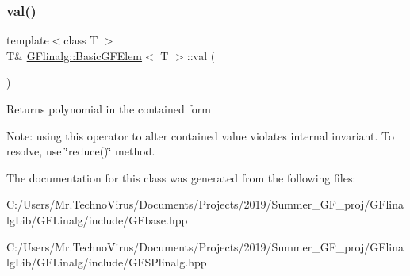 \subsubsection{\texorpdfstring{val()}{val()}}
{\footnotesize\ttfamily template$<$class T $>$ \\
T\& \mbox{\hyperlink{class_g_flinalg_1_1_basic_g_f_elem}{G\+Flinalg\+::\+Basic\+G\+F\+Elem}}$<$ T $>$\+::val (\begin{DoxyParamCaption}{ }\end{DoxyParamCaption})\hspace{0.3cm}{\ttfamily [inline]}}

Returns polynomial in the contained form

Note\+: using this operator to alter contained value violates internal invariant. To resolve, use \char`\"{}reduce()\char`\"{} method. 

The documentation for this class was generated from the following files\+:\begin{DoxyCompactItemize}
\item 
C\+:/\+Users/\+Mr.\+Techno\+Virus/\+Documents/\+Projects/2019/\+Summer\+\_\+\+G\+F\+\_\+proj/\+G\+Flinalg\+Lib/\+G\+F\+Linalg/include/G\+Fbase.\+hpp\item 
C\+:/\+Users/\+Mr.\+Techno\+Virus/\+Documents/\+Projects/2019/\+Summer\+\_\+\+G\+F\+\_\+proj/\+G\+Flinalg\+Lib/\+G\+F\+Linalg/include/G\+F\+S\+Plinalg.\+hpp\end{DoxyCompactItemize}
